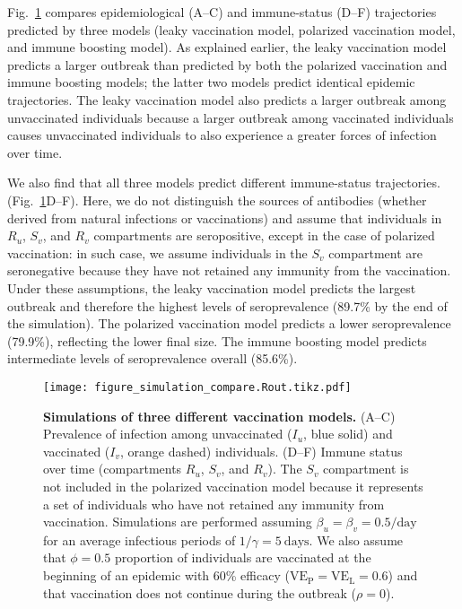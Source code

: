 \documentclass[12pt]{article}
\newcommand{\fref}[1]{Fig.~\ref{fig:#1}}
\newcommand{\VE}{\ensuremath{\mathrm{VE}}}
\newcommand{\VEP}{\ensuremath{\VE_{\mathrm{P}}}}
\newcommand{\VEL}{\ensuremath{\VE_{\mathrm{L}}}}
\begin{document}
\fref{simulation} compares epidemiological (A--C) and immune-status (D--F) trajectories predicted by three models (leaky vaccination model, polarized vaccination model, and immune boosting model).
As explained earlier, the leaky vaccination model predicts a larger outbreak than predicted by both the polarized vaccination and immune boosting models;
the latter two models predict identical epidemic trajectories.
The leaky vaccination model also predicts a larger outbreak among unvaccinated individuals because a larger outbreak among vaccinated individuals causes unvaccinated individuals to also experience a greater forces of infection over time.

We also find that all three models predict different immune-status trajectories. (\fref{simulation}D--F). 
Here, we do not distinguish the sources of antibodies (whether derived from natural infections or vaccinations) and assume that individuals in $R_u$, $S_v$, and $R_v$ compartments are seropositive, except in the case of polarized vaccination:
in such case, we assume individuals in the $S_v$ compartment are seronegative because they have not retained any immunity from the vaccination.
Under these assumptions, the leaky vaccination model predicts the largest outbreak and therefore the highest levels of seroprevalence (89.7\% by the end of the simulation).
The polarized vaccination model predicts a lower seroprevalence (79.9\%), reflecting the lower final size.
The immune boosting model predicts intermediate levels of seroprevalence overall (85.6\%).

\begin{figure}[!th]
\texttt{[image: figure\_simulation\_compare.Rout.tikz.pdf]}
\caption{
\textbf{Simulations of three different vaccination models.}
(A--C) Prevalence of infection among unvaccinated ($I_u$, blue solid) and vaccinated ($I_v$, orange dashed) individuals.
(D--F) Immune status over time (compartments $R_u$, $S_v$, and $R_v$).
The $S_v$ compartment is not included in the polarized vaccination model because it represents a set of individuals who have not retained any immunity from vaccination.
Simulations are performed assuming $\beta_u = \beta_v =0.5/\mathrm{day}$ for an average infectious periods of $1/\gamma=5~\mathrm{days}$.
We also assume that $\phi = 0.5$ proportion of individuals are vaccinated at the beginning of an epidemic with 60\% efficacy ($\VEP=\VEL=0.6$) and that vaccination does not continue during the outbreak ($\rho = 0$).
\label{fig:simulation}
}
\end{figure}
\end{document}
